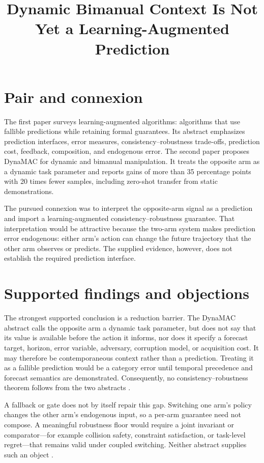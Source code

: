 \documentclass{article}
\title{Dynamic Bimanual Context Is Not Yet a Learning-Augmented Prediction}
\begin{document}
\maketitle

\section{Pair and connexion}

The first paper surveys learning-augmented algorithms: algorithms that use fallible predictions while retaining formal guarantees.  Its abstract emphasizes prediction interfaces, error measures, consistency--robustness trade-offs, prediction cost, feedback, composition, and endogenous error.  The second paper proposes DynaMAC for dynamic and bimanual manipulation.  It treats the opposite arm as a dynamic task parameter and reports gains of more than 35 percentage points with 20 times fewer samples, including zero-shot transfer from static demonstrations.

The pursued connexion was to interpret the opposite-arm signal as a prediction and import a learning-augmented consistency--robustness guarantee.  That interpretation would be attractive because the two-arm system makes prediction error endogenous: either arm's action can change the future trajectory that the other arm observes or predicts.  The supplied evidence, however, does not establish the required prediction interface.

\section{Supported findings and objections}

The strongest supported conclusion is a reduction barrier.  The DynaMAC abstract calls the opposite arm a dynamic task parameter, but does not say that its value is available before the action it informs, nor does it specify a forecast target, horizon, error variable, adversary, corruption model, or acquisition cost.  It may therefore be contemporaneous context rather than a prediction.  Treating it as a fallible prediction would be a category error until temporal precedence and forecast semantics are demonstrated.  Consequently, no consistency--robustness theorem follows from the two abstracts .

A fallback or gate does not by itself repair this gap.  Switching one arm's policy changes the other arm's endogenous input, so a per-arm guarantee need not compose.  A meaningful robustness floor would require a joint invariant or comparator---for example collision safety, constraint satisfaction, or task-level regret---that remains valid under coupled switching.  Neither abstract supplies such an object .
\end{document}
